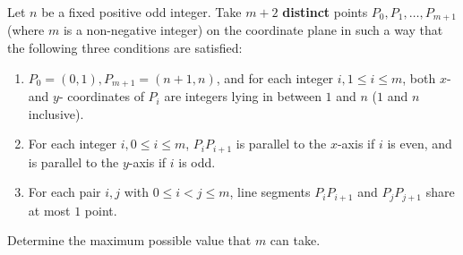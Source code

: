 Let $n$ be a fixed positive odd integer. Take $m+2$ \textbf{distinct} points $P_0,P_1,\ldots ,P_{m+1}$ (where $m$ is a non-negative integer) on the coordinate plane in such a way that the following three conditions are satisfied:
\begin{enumerate}[label=(\arabic*)]
	\item $P_0=(0,1),P_{m+1}=(n+1,n)$, and for each integer $i,1\le i\le m$, both $x$- and $y$- coordinates of $P_i$ are integers lying in between $1$ and $n$ ($1$ and $n$ inclusive).
	\item For each integer $i,0\le i\le m$, $P_iP_{i+1}$ is parallel to the $x$-axis if $i$ is even, and is parallel to the $y$-axis if $i$ is odd.
	\item For each pair $i,j$ with $0\le i<j\le m$, line segments $P_iP_{i+1}$ and $P_jP_{j+1}$ share at most $1$ point.
\end{enumerate}
Determine the maximum possible value that $m$ can take.